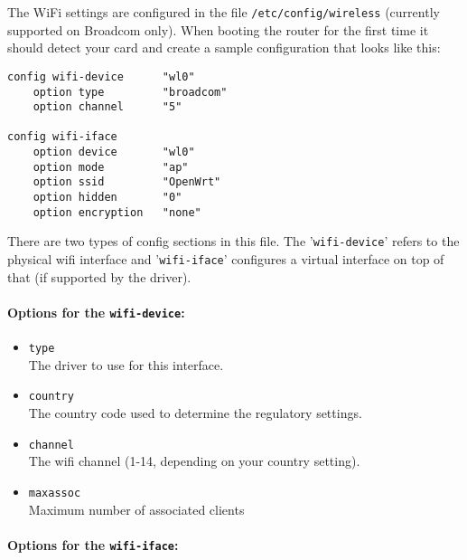 The WiFi settings are configured in the file \texttt{/etc/config/wireless}
(currently supported on Broadcom only). When booting the router for the first time
it should detect your card and create a sample configuration that looks like this:

\begin{Verbatim}
config wifi-device      "wl0"
    option type         "broadcom"
    option channel      "5"

config wifi-iface
    option device       "wl0"
    option mode         "ap"
    option ssid         "OpenWrt"
    option hidden       "0"
    option encryption   "none"
\end{Verbatim}

There are two types of config sections in this file. The '\texttt{wifi-device}' refers to
the physical wifi interface and '\texttt{wifi-iface}' configures a virtual interface on top
of that (if supported by the driver).

\paragraph{Options for the \texttt{wifi-device}:}

\begin{itemize}
    \item \texttt{type} \\
        The driver to use for this interface.

    \item \texttt{country} \\
        The country code used to determine the regulatory settings.

    \item \texttt{channel} \\
        The wifi channel (1-14, depending on your country setting).

    \item \texttt{maxassoc} \\
        Maximum number of associated clients

\end{itemize}

\paragraph{Options for the \texttt{wifi-iface}:}

